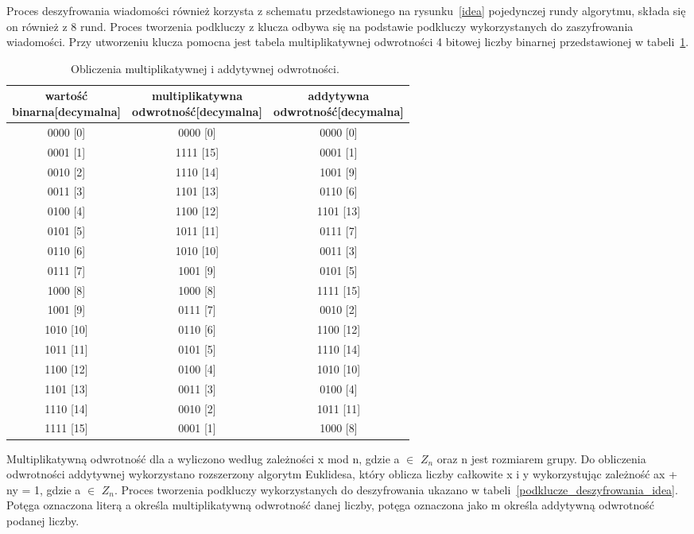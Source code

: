 \documentclass[12p]{article}
\begin{document}
Proces deszyfrowania wiadomości również korzysta z schematu przedstawionego na rysunku~\ref{idea} pojedynczej rundy algorytmu, składa się on również z 8 rund. Proces tworzenia podkluczy z klucza odbywa się na podstawie podkluczy wykorzystanych do zaszyfrowania wiadomości. Przy utworzeniu klucza pomocna jest tabela multiplikatywnej odwrotności 4 bitowej liczby binarnej przedstawionej w tabeli~\ref{nibel}.

\begin{table}[H]
\centering
\begin{tabular}{|c|c|c|}
\hline
\thead{wartość \\ binarna[decymalna]} & \thead{multiplikatywna \\  odwrotność[decymalna]} & \thead{addytywna \\ odwrotność[decymalna]}\\ \hline
0000 [0]&0000 [0]&0000 [0] \\ \hline
 0001 [1]&1111 [15]&0001 [1]\\ \hline
 0010 [2]&1110 [14]&1001 [9]\\ \hline
 0011 [3]&1101 [13]&0110 [6]\\ \hline
 0100 [4]&1100 [12]&1101 [13]\\ \hline
 0101 [5]&1011 [11]&0111 [7]\\ \hline
 0110 [6]&1010 [10]&0011 [3]\\ \hline
 0111 [7]&1001 [9]&0101 [5]\\ \hline
 1000 [8]&1000 [8]&1111 [15]\\ \hline
 1001 [9]&0111 [7]&0010 [2]\\ \hline
 1010 [10]&0110 [6]&1100 [12]\\ \hline
 1011 [11]&0101 [5]&1110 [14]\\ \hline
 1100 [12]&0100 [4]&1010 [10]\\ \hline
 1101 [13]&0011 [3]&0100 [4]\\ \hline
 1110 [14]&0010 [2]&1011 [11]\\ \hline
 1111 [15]&0001 [1]&1000 [8]\\ \hline
 \end{tabular}
\caption{Obliczenia multiplikatywnej i addytywnej odwrotności.~\cite{IDEAA}}\label{nibel}
\end{table}

Multiplikatywną odwrotność dla a wyliczono według zależności x mod n, gdzie a $\in$ $Z_{n}$ oraz n jest rozmiarem grupy. Do obliczenia odwrotności addytywnej wykorzystano rozszerzony algorytm Euklidesa, który oblicza liczby całkowite x i y wykorzystując zależność ax + ny = 1, gdzie a $\in$ $Z_{n}$. Proces tworzenia podkluczy wykorzystanych do deszyfrowania ukazano w tabeli~\ref{podklucze_deszyfrowania_idea}. Potęga oznaczona literą a określa multiplikatywną odwrotność danej liczby, potęga oznaczona jako m określa addytywną odwrotność podanej liczby.
\end{document}
